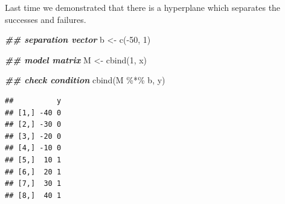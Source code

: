 \documentclass[
  ignorenonframetext,
]{beamer}
\newenvironment{Shaded}{\begin{snugshade}}{\end{snugshade}}
\newcommand{\DecValTok}[1]{\textcolor[rgb]{0.00,0.00,0.81}{#1}}
\newcommand{\DocumentationTok}[1]{\textcolor[rgb]{0.56,0.35,0.01}{\textbf{\textit{#1}}}}
\newcommand{\FunctionTok}[1]{\textcolor[rgb]{0.00,0.00,0.00}{#1}}
\newcommand{\NormalTok}[1]{#1}
\newcommand{\OtherTok}[1]{\textcolor[rgb]{0.56,0.35,0.01}{#1}}
\newcommand{\SpecialCharTok}[1]{\textcolor[rgb]{0.00,0.00,0.00}{#1}}
\begin{document}
\begin{frame}[fragile]{}
\protect\hypertarget{section-1}{}
Last time we demonstrated that there is a hyperplane which separates the
successes and failures.

\vspace{12pt}
\tiny

\begin{Shaded}
\begin{Highlighting}[]
\DocumentationTok{\#\# separation vector}
\NormalTok{b }\OtherTok{\textless{}{-}} \FunctionTok{c}\NormalTok{(}\SpecialCharTok{{-}}\DecValTok{50}\NormalTok{, }\DecValTok{1}\NormalTok{) }

\DocumentationTok{\#\# model matrix}
\NormalTok{M }\OtherTok{\textless{}{-}} \FunctionTok{cbind}\NormalTok{(}\DecValTok{1}\NormalTok{, x)}

\DocumentationTok{\#\# check condition}
\FunctionTok{cbind}\NormalTok{(M }\SpecialCharTok{\%*\%}\NormalTok{ b, y)}
\end{Highlighting}
\end{Shaded}

\begin{verbatim}
##          y
## [1,] -40 0
## [2,] -30 0
## [3,] -20 0
## [4,] -10 0
## [5,]  10 1
## [6,]  20 1
## [7,]  30 1
## [8,]  40 1
\end{verbatim}
\end{frame}
\end{document}
